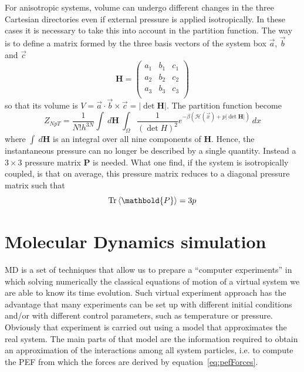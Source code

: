 For anisotropic systems, volume can undergo different changes in the three Cartesian directories even if external
pressure is applied isotropically. In these cases it is necessary to take this into account in the partition
function. The way is to define a matrix formed by the three basis vectors of the system box $\vec a$, $\vec b$
and $\vec c$
\begin{equation}
	 \mathbold{H} =
	\begin{pmatrix}
		a_1 & b_1 & c_1 \\
		a_2 & b_2 & c_2 \\
		a_3 & b_3 & c_3 \\
	\end{pmatrix}
	\label{eq:volumeMatrix}
\end{equation}
so that its volume is $V = \vec a\cdot \vec b\times \vec c = |\det{ \mathbold{H}}|$. The partition function become
\begin{equation*}
	Z_{NpT} = \frac{1}{N!h^{3N}}\int\ d \mathbold{H} \ \int_\Omega \frac{1}{(\det{H})^2} e^{-\beta(\mathcal{H}(\vec x) + p|\det{ \mathbold{H}}|)}\ dx
\end{equation*}
where $\int\ d\mathbold{H}$ is an integral over all nine components of $\mathbold{H}$. Hence, the instantaneous
pressure can no longer be described by a single quantity. Instead a $3\times 3$ pressure matrix $ \mathbold{P}$
is needed. What one find, if the system is isotropically coupled, is that on average, this pressure matrix
reduces to a diagonal pressure matrix such that
\begin{equation*}
	\text{Tr}\ave{ \mathbold{P}} = 3p
\end{equation*}

\newpage
\section{Molecular Dynamics simulation}
\label{sec:MD}
\acf{MD} is a set of techniques that allow us to prepare a ``computer experiments'' in which solving numerically
the classical equations of motion of a virtual system we are able to know its time evolution. Such virtual
experiment approach has the advantage that many experiments can be set up with different initial conditions
and/or with different control parameters, such as temperature or pressure. Obviously that experiment is carried
out using a model that approximates the real system. The main parts of that model are the information required to
obtain an approximation of the interactions among all system particles, i.e. to compute the \ac{PEF} from which
the forces are derived by equation~\eqref{eq:pefForces}.

